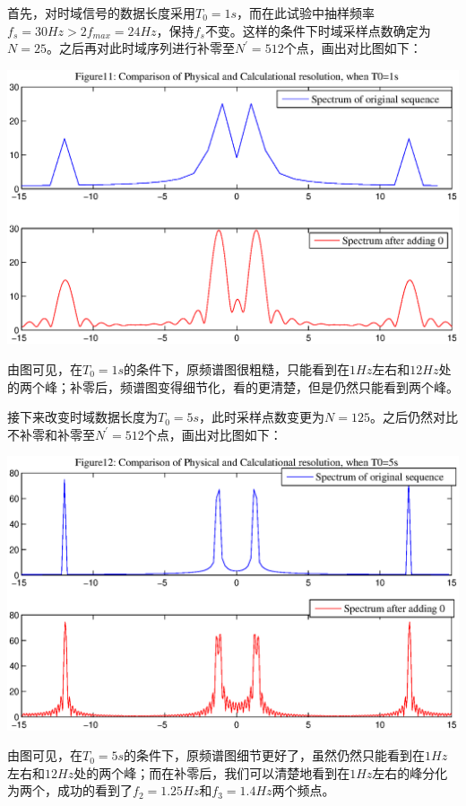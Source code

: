 \documentclass[a4paper,11pt,onecolumn,twoside]{article}
\begin{document}
首先，对时域信号的数据长度采用$T_0=1s$，而在此试验中抽样频率$f_s=30Hz>2f_{max}=24Hz$，保持$f_s$不变。这样的条件下时域采样点数确定为$N=25$。之后再对此时域序列进行补零至$N^{'}=512$个点，画出对比图如下：
\begin{center}
    \includegraphics[width=1\textwidth]{fig11.eps}
\end{center}
由图可见，在$T_0=1s$的条件下，原频谱图很粗糙，只能看到在$1Hz$左右和$12Hz$处的两个峰；补零后，频谱图变得细节化，看的更清楚，但是仍然只能看到两个峰。

接下来改变时域数据长度为$T_0=5s$，此时采样点数变更为$N=125$。之后仍然对比不补零和补零至$N^{'}=512$个点，画出对比图如下：
\begin{center}
    \includegraphics[width=1\textwidth]{fig12.eps}
\end{center}
由图可见，在$T_0=5s$的条件下，原频谱图细节更好了，虽然仍然只能看到在$1Hz$左右和$12Hz$处的两个峰；而在补零后，我们可以清楚地看到在$1Hz$左右的峰分化为两个，成功的看到了$f_2=1.25Hz$和$f_3=1.4Hz$两个频点。
\end{document}
